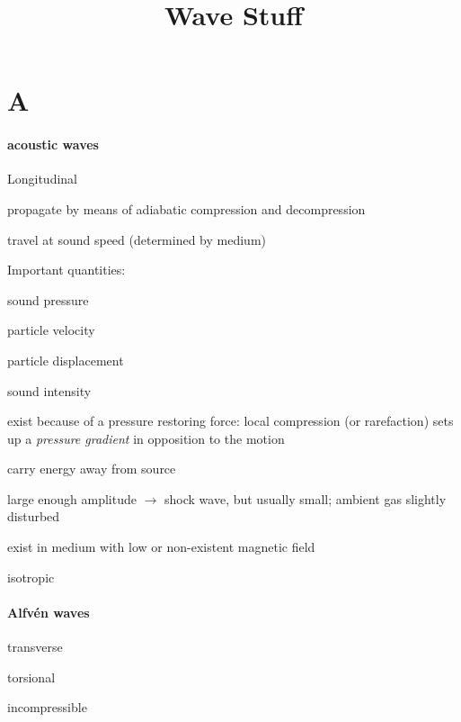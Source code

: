 \documentclass[12pt]{article}
\title{\vspace{-0.5in}Wave Stuff}
\author{}
\date{}
\begin{document}
\maketitle

\vspace{-1in}

\section*{A}

\paragraph{acoustic waves}
\begin{itemize*}
    \item Longitudinal
    \item propagate by means of adiabatic compression and decompression
    \item travel at sound speed (determined by medium)
    \item Important quantities:
        \begin{itemize*}
            \item sound pressure
            \item particle velocity
            \item particle displacement
            \item sound intensity
        \end{itemize*}
    \item exist because of a pressure restoring force: local compression
        (or rarefaction) sets up a \emph{pressure gradient} in opposition
        to the motion
    \item carry energy away from source
    \item large enough amplitude $\rightarrow$ shock wave,
        but usually small; ambient gas slightly disturbed
    \item exist in medium with low or non-existent magnetic field
    \item isotropic
\end{itemize*}

\paragraph{Alfv\'en waves}
\begin{itemize*}
    \item transverse
    \item torsional
    \item incompressible
\end{itemize*}
\end{document}

